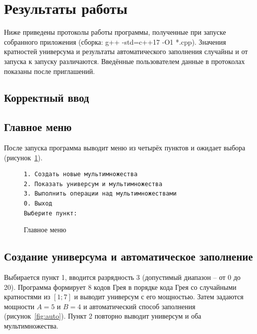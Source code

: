 \documentclass[14pt,a4paper]{extreport}
\newcommand{\code}[1]{{\ttfamily #1}}
\begin{document}
\section{Результаты работы}

Ниже приведены протоколы работы программы, полученные при запуске собранного приложения (сборка: \code{g++ -std=c++17 -O1 *.cpp}). Значения кратностей универсума и результаты автоматического заполнения случайны и от запуска к запуску различаются. Введённые пользователем данные в протоколах показаны после приглашений.

\subsection*{Корректный ввод}

\subsection{Главное меню}

После запуска программа выводит меню из четырёх пунктов и ожидает выбора (рисунок~\ref{fig:menu}).

\begin{figure}[H]
\begin{lstlisting}[numbers=none,frame=single]
1. Создать новые мультимножества
2. Показать универсум и мультимножества
3. Выполнить операции над мультимножествами
0. Выход
Выберите пункт: 
\end{lstlisting}
\caption{Главное меню}\label{fig:menu}
\end{figure}

\subsection{Создание универсума и автоматическое заполнение}

Выбирается пункт 1, вводится разрядность 3 (допустимый диапазон -- от 0 до 20). Программа формирует 8 кодов Грея в порядке кода Грея со случайными кратностями из $[1;7]$ и выводит универсум с его мощностью. Затем задаются мощности $A=5$ и $B=4$ и автоматический способ заполнения (рисунок~\ref{fig:auto}). Пункт 2 повторно выводит универсум и оба мультимножества.
\end{document}
